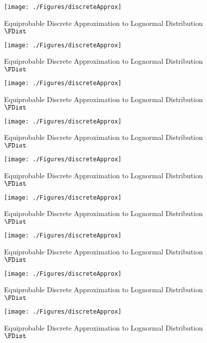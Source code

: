   \begin{figure}
    \texttt{[image: ./Figures/discreteApprox]}
    \caption{Equiprobable Discrete Approximation to Lognormal Distribution $\FDist$}
    \label{fig:discreteapprox}
  \end{figure}
  \hypertarget{discreteApprox}{}
  \begin{figure}
    \texttt{[image: ./Figures/discreteApprox]}
    \caption{Equiprobable Discrete Approximation to Lognormal Distribution $\FDist$}
    \label{fig:discreteapprox}
  \end{figure}
  \hypertarget{discreteApprox}{}
  \begin{figure}
    \texttt{[image: ./Figures/discreteApprox]}
    \caption{Equiprobable Discrete Approximation to Lognormal Distribution $\FDist$}
    \label{fig:discreteapprox}
  \end{figure}
  \hypertarget{discreteApprox}{}
  \begin{figure}
    \texttt{[image: ./Figures/discreteApprox]}
    \caption{Equiprobable Discrete Approximation to Lognormal Distribution $\FDist$}
    \label{fig:discreteapprox}
  \end{figure}
  \hypertarget{discreteApprox}{}
  \begin{figure}
    \texttt{[image: ./Figures/discreteApprox]}
    \caption{Equiprobable Discrete Approximation to Lognormal Distribution $\FDist$}
    \label{fig:discreteapprox}
  \end{figure}
  \hypertarget{discreteApprox}{}
  \begin{figure}
    \texttt{[image: ./Figures/discreteApprox]}
    \caption{Equiprobable Discrete Approximation to Lognormal Distribution $\FDist$}
    \label{fig:discreteapprox}
  \end{figure}
  \hypertarget{discreteApprox}{}
  \begin{figure}
    \texttt{[image: ./Figures/discreteApprox]}
    \caption{Equiprobable Discrete Approximation to Lognormal Distribution $\FDist$}
    \label{fig:discreteapprox}
  \end{figure}
  \hypertarget{discreteApprox}{}
  \begin{figure}
    \texttt{[image: ./Figures/discreteApprox]}
    \caption{Equiprobable Discrete Approximation to Lognormal Distribution $\FDist$}
    \label{fig:discreteapprox}
  \end{figure}
  \hypertarget{discreteApprox}{}
  \begin{figure}
    \texttt{[image: ./Figures/discreteApprox]}
    \caption{Equiprobable Discrete Approximation to Lognormal Distribution $\FDist$}
    \label{fig:discreteapprox}
  \end{figure}
